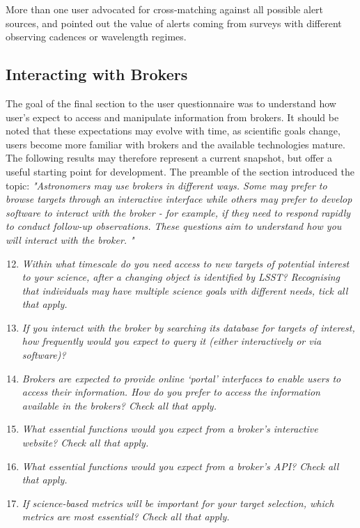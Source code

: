 \documentclass{article}
\begin{document}
More than one user advocated for cross-matching against all possible alert sources, and pointed out the value of alerts coming from surveys with different observing cadences or wavelength regimes. 

\subsection{Interacting with Brokers}

The goal of the final section to the user questionnaire was to understand how user's expect to access and manipulate information from brokers.  It should be noted that these expectations may evolve with time, as scientific goals change, users become more familiar with brokers and the available technologies mature.  The following results may therefore represent a current snapshot, but offer a useful starting point for development.  The preamble of the section introduced the topic:
{\em "Astronomers may use brokers in different ways.  Some may prefer to browse targets through an interactive interface while others may prefer to develop software to interact with the broker - for example, if they need to respond rapidly to conduct follow-up observations.  These questions aim to understand how you will interact with the broker. "}

\begin{enumerate}
\setcounter{enumi}{11}
\item {\em Within what timescale do you need access to new targets of potential interest to your science, after a changing object is identified by LSST?  Recognising that individuals may have multiple science goals with different needs, tick all that apply.}
\item {\em If you interact with the broker by searching its database for targets of interest, how frequently would you expect to query it (either interactively or via software)?}
\item {\em Brokers are expected to provide online `portal' interfaces to enable users to access their information.  How do you prefer to access the information available in the brokers?   Check all that apply.}
\item {\em What essential functions would you expect from a broker’s interactive website?  Check all that apply.}
\item {\em What essential functions would you expect from a broker’s API?  Check all that apply.}
\item {\em If science-based metrics will be important for your target selection, which metrics are most essential?  Check all that apply.}
\end{enumerate}
\end{document}
